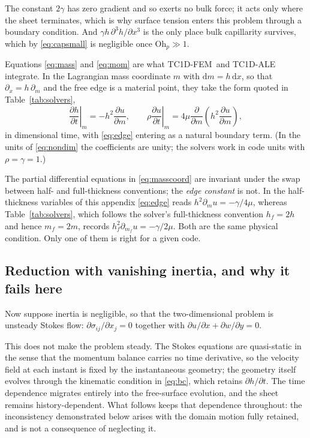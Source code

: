 \documentclass[11pt,a4paper]{article}
\newcommand{\TC}{\textsf{TC1D-FEM}}
\newcommand{\Ohp}{\mathrm{Oh}_{p}}
\begin{document}
The constant $2\gamma$ has zero gradient and so
exerts no bulk force; it acts only where the sheet terminates, which is why
surface tension enters this problem through a boundary condition. And
$\gamma h\,\partial^{3}h/\partial x^{3}$ is the only place bulk capillarity
survives, which by \eqref{eq:capsmall} is negligible once $\Ohp \gg 1$.

Equations \eqref{eq:mass} and \eqref{eq:mom} are what \TC\ and
\textsf{TC1D-ALE} integrate. In the Lagrangian mass coordinate $m$ with
$\mathrm{d}m = h\,\mathrm{d}x$, so that $\partial_{x} = h\,\partial_{m}$ and the
free edge is a material point, they take the form quoted in
Table~\ref{tab:solvers},
%
\begin{equation}
  \left.\frac{\partial h}{\partial t}\right|_{m} = -h^{2}\frac{\partial u}{\partial m},
  \qquad
  \rho \left.\frac{\partial u}{\partial t}\right|_{m}
    = 4\mu \frac{\partial}{\partial m}\left( h^{2} \frac{\partial u}{\partial m}\right),
  \label{eq:masscoord}
\end{equation}
%
in dimensional time, with \eqref{eq:edge} entering as a natural boundary term.
(In the units of \eqref{eq:nondim} the coefficients are unity; the solvers work
in code units with $\rho = \gamma = 1$.)

The partial differential equations in \eqref{eq:masscoord} are invariant under
the swap between half- and full-thickness conventions; the \emph{edge constant}
is not. In the half-thickness variables of this appendix \eqref{eq:edge} reads
$h^{2}\partial_{m}u = -\gamma/4\mu$, whereas Table~\ref{tab:solvers}, which
follows the solver's full-thickness convention $h_{f} = 2h$ and hence
$m_{f} = 2m$, records $h_{f}^{2}\partial_{m_{f}}u = -\gamma/2\mu$. Both are the
same physical condition. Only one of them is right for a given code.

\subsection{Reduction with vanishing inertia, and why it fails here}
\label{sec:stokes}

Now suppose inertia is negligible, so that the two-dimensional problem is
unsteady Stokes flow: $\partial\sigma_{ij}/\partial x_{j} = 0$ together with
$\partial u/\partial x + \partial w/\partial y = 0$.

This does not make the problem steady. The Stokes equations are quasi-static
in the sense that the momentum balance carries no time derivative, so the
velocity field at each instant is fixed by the instantaneous geometry; the
geometry itself evolves through the kinematic condition in \eqref{eq:bc},
which retains $\partial h/\partial t$. The time dependence migrates entirely
into the free-surface evolution, and the sheet remains history-dependent. What
follows keeps that dependence throughout: the inconsistency demonstrated below
arises with the domain motion fully retained, and is not a consequence of
neglecting it.
\end{document}
